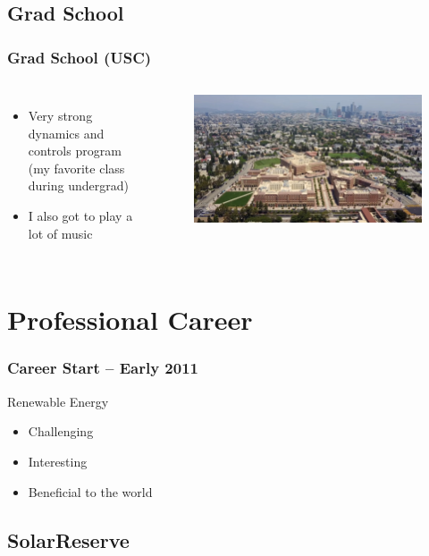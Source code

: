 \documentclass[aspectratio=169]{beamer}
\begin{document}
\subsection{Grad School}
\begin{frame}
  \frametitle{Grad School (USC)}
  \begin{columns}[t]
  \begin{itemize}
  \item Very strong dynamics and controls
    program (my favorite class during undergrad)
  \item I also got to play a lot of music
  \end{itemize}

  \begin{figure}
    \includegraphics[width=0.7\linewidth]{USC.jpg}
  \end{figure}
  \end{columns}
\end{frame}

\section{Professional Career}

\begin{frame}
  \frametitle{Career Start -- Early 2011}
  \begin{block}{Renewable Energy}
    \begin{itemize}
      \item Challenging
      \item Interesting
      \item Beneficial to the world
    \end{itemize}
  \end{block}  
\end{frame}

\subsection{SolarReserve}
\end{document}
